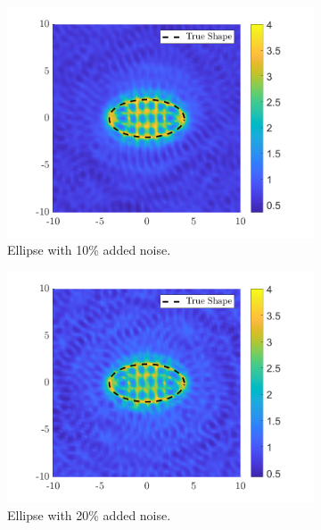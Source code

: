 \documentclass[]{article}
\begin{document}
			\begin{figure}[h]
				\centering
				\begin{subfigure}{.3\textwidth}
					\centering
					\includegraphics[width = \textwidth]{Numeric Simulations/Images/ellipse-10-noise-reconstructed}
					\caption{Ellipse with 10\% added noise.}
				\end{subfigure}
				\begin{subfigure}{.3\textwidth}
					\centering
					\includegraphics[width = \textwidth]{Numeric Simulations/Images/ellipse-20-noise-reconstructed}
					\caption{Ellipse with 20\% added noise.}
				\end{subfigure}
				\begin{subfigure}{.3\textwidth}

\end{subfigure}
\end{figure}
\end{document}
